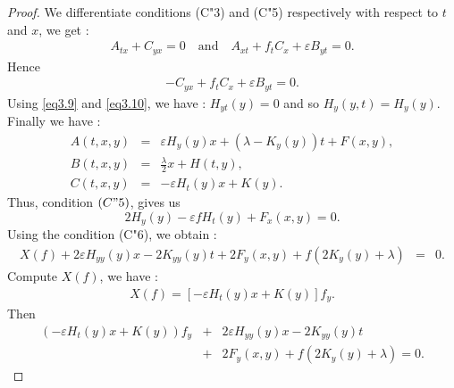 \documentclass[reqno, 12pt]{amsart}
\numberwithin{equation}{section}
\begin{document}
\begin{proof}
We differentiate conditions (C"3) and (C"5) respectively with respect to $t$ and $x$, 
we get :
\begin{eqnarray*}
A_{tx} + C_{yx}=0 \quad \mbox{and}\quad
A_{xt} + f_{t}C_{x}+\varepsilon B_{yt} = 0.
\end{eqnarray*}
Hence
\begin{eqnarray*}
- C_{yx} + f_tC_x + \varepsilon B_{yt} = 0.
\end{eqnarray*}
Using \eqref{eq3.9} and \eqref{eq3.10}, we have : $ H_{yt}(y)=0$ and
so $H_{y}(y,t) = H_{y}(y)$. Finally we have :
\begin{eqnarray*}
A(t,x,y) &=& \varepsilon H_{y}(y)x + \left( \lambda - K_{y}(y)\right) t + F(x,y),\\
B(t,x,y) &=& \frac{\lambda}{2}x + H(t,y),\\
C(t,x,y) &=& - \varepsilon H_{t}(y)x+K(y).
\end{eqnarray*}
Thus, condition $(C"5)$, gives us
\begin{equation*}
2H_y(y) - \varepsilon f H_t(y) + F_x(x,y)=0.
\end{equation*}
Using the condition (C"6), we obtain :
\begin{eqnarray*}
X(f) + 2\varepsilon H_{yy}(y)x - 2K_{yy}(y)t + 2F_{y}(x,y) 
+ f\left( 2K_{y}(y)+\lambda\right) &=& 0.
\end{eqnarray*}
Compute $X(f)$, we have :
\begin{eqnarray*}
X(f) = \left[ -\varepsilon H_{t}(y)x + K(y)\right] f_y. 
\end{eqnarray*}
Then
\begin{eqnarray*}
\left( -\varepsilon H_{t}(y)x + K(y)\right)f_y &+& 2\varepsilon H_{yy}(y)x 
-2K_{yy}(y)t \\
&+& 2F_{y}(x,y) + f\left( 2K_{y}(y) + \lambda\right) =0.   
	\end{eqnarray*}
\end{proof}	
\end{document}
